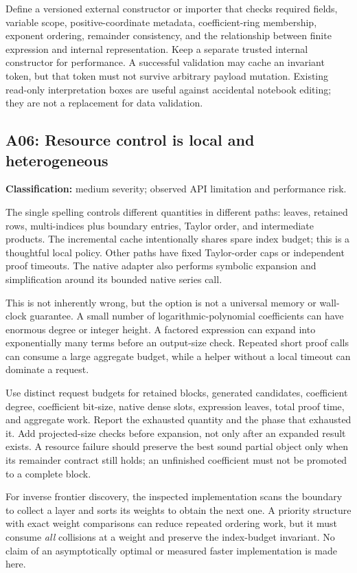 \documentclass[11pt,letterpaper]{article}
\newcommand{\code}[1]{\texttt{\detokenize{#1}}}
\newcommand{\finding}[3]{\subsection{#1: #2}\textbf{Classification:} #3.\par}
\begin{document}
Define a versioned external constructor or importer that checks required fields, variable scope, positive-coordinate metadata, coefficient-ring membership, exponent ordering, remainder consistency, and the relationship between finite expression and internal representation. Keep a separate trusted internal constructor for performance. A successful validation may cache an invariant token, but that token must not survive arbitrary payload mutation. Existing read-only interpretation boxes are useful against accidental notebook editing; they are not a replacement for data validation.\cite{core}

\finding{A06}{Resource control is local and heterogeneous}{medium severity; observed API limitation and performance risk}
The single spelling \code{"MaxTerms"} controls different quantities in different paths: leaves, retained rows, multi-indices plus boundary entries, Taylor order, and intermediate products. The incremental cache intentionally shares spare index budget; this is a thoughtful local policy. Other paths have fixed Taylor-order caps or independent proof timeouts. The native adapter also performs symbolic expansion and simplification around its bounded native series call.\cite{core,incremental,native,guide}

This is not inherently wrong, but the option is not a universal memory or wall-clock guarantee. A small number of logarithmic-polynomial coefficients can have enormous degree or integer height. A factored expression can expand into exponentially many terms before an output-size check. Repeated short proof calls can consume a large aggregate budget, while a helper without a local timeout can dominate a request.

Use distinct request budgets for retained blocks, generated candidates, coefficient degree, coefficient bit-size, native dense slots, expression leaves, total proof time, and aggregate work. Report the exhausted quantity and the phase that exhausted it. Add projected-size checks before expansion, not only after an expanded result exists. A resource failure should preserve the best sound partial object only when its remainder contract still holds; an unfinished coefficient must not be promoted to a complete block.

For inverse frontier discovery, the inspected implementation scans the boundary to collect a layer and sorts its weights to obtain the next one. A priority structure with exact weight comparisons can reduce repeated ordering work, but it must consume \emph{all} collisions at a weight and preserve the index-budget invariant. No claim of an asymptotically optimal or measured faster implementation is made here.\cite{incremental}
\end{document}

